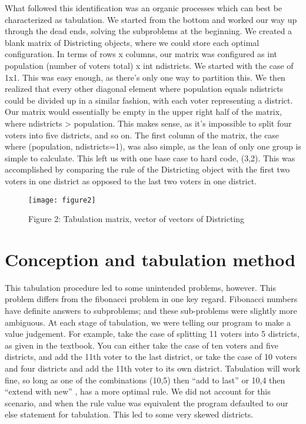 \documentclass{article}
\begin{document}
\hspace{\parindent}
	What followed this identification was an organic processes which can best be characterized as tabulation. We started from the bottom and worked our way up through the dead ends, solving the subproblems at the beginning. We created a blank matrix of Districting objects, where we could store each optimal configuration. In terms of rows x columns, our matrix was configured as int population (number of voters total) x int ndistricts. We started with the case of 1x1. This was easy enough, as there’s only one way to partition this. We then realized that every other diagonal element where population equals ndistricts could be divided up in a similar fashion, with each voter representing a district. Our matrix would essentially be empty in the upper right half of the matrix, where ndistricts > population. This makes sense, as it’s impossible to split four voters into five districts, and so on. The first column of the matrix, the case where (population, ndistricts=1), was also simple, as the lean of only one group is simple to calculate. This left us with one base case to hard code, (3,2). This was accomplished by comparing  the rule of the Districting object with the first two voters in one district as opposed to the last two voters in one district. 


\begin{figure}[ht]
  \texttt{[image: figure2]}
  \centering
  \caption{Figure 2: Tabulation matrix, vector of vectors of Districting }
  \label{fig:apollo}
  \end{figure}

\section{Conception and tabulation method}
\hspace{\parindent}
This tabulation procedure led to some unintended problems, however. This problem differs from the fibonacci problem in one key regard. Fibonacci numbers have definite answers to subproblems; and these sub-problems were slightly more ambiguous. At each stage of tabulation, we were telling our program to make a value judgement. For example, take the case of splitting 11 voters into 5 districts, as given in the textbook. You can either take the case of ten voters and five districts, and add the 11th voter to the last district, or take the case of 10 voters and four districts and add the 11th voter to its own district. Tabulation will work fine, so long as one of the combinations (10,5) then “add to last” or 10,4  then “extend with new” , has a more optimal rule. We did not account for this scenario, and when the rule value was equivalent the program defaulted to our else statement for tabulation. This led to some very skewed districts. 
\hspace{\parindent}
\end{document}
